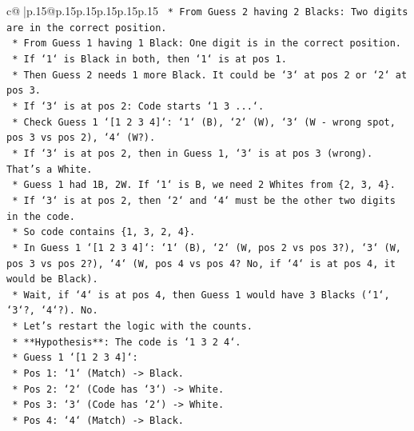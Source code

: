 \documentclass{article}
\begin{document}
{\begin{supertabular}{c@{$\;$}|p{.15\linewidth}@{}p{.15\linewidth}p{.15\linewidth}p{.15\linewidth}p{.15\linewidth}p{.15\linewidth}}
{{{\texttt{                *   From Guess 2 having 2 Blacks: Two digits are in the correct position.} \\
\texttt{                *   From Guess 1 having 1 Black: One digit is in the correct position.} \\
\texttt{                *   If `1` is Black in both, then `1` is at pos 1.} \\
\texttt{                *   Then Guess 2 needs 1 more Black. It could be `3` at pos 2 or `2` at pos 3.} \\
\texttt{                *   If `3` is at pos 2: Code starts `1 3 ...`.} \\
\texttt{                    *   Check Guess 1 `{[}1 2 3 4{]}`: `1` (B), `2` (W), `3` (W {-} wrong spot, pos 3 vs pos 2), `4` (W?).} \\
\texttt{                    *   If `3` is at pos 2, then in Guess 1, `3` is at pos 3 (wrong). That's a White.} \\
\texttt{                    *   Guess 1 had 1B, 2W. If `1` is B, we need 2 Whites from \{2, 3, 4\}.} \\
\texttt{                    *   If `3` is at pos 2, then `2` and `4` must be the other two digits in the code.} \\
\texttt{                    *   So code contains \{1, 3, 2, 4\}.} \\
\texttt{                    *   In Guess 1 `{[}1 2 3 4{]}`: `1` (B), `2` (W, pos 2 vs pos 3?), `3` (W, pos 3 vs pos 2?), `4` (W, pos 4 vs pos 4? No, if `4` is at pos 4, it would be Black).} \\
\texttt{                    *   Wait, if `4` is at pos 4, then Guess 1 would have 3 Blacks (`1`, `3`?, `4`?). No.} \\
\texttt{                    *   Let's restart the logic with the counts.} \\
\texttt{                    *   **Hypothesis**: The code is `1 3 2 4`.} \\
\texttt{                        *   Guess 1 `{[}1 2 3 4{]}`:} \\
\texttt{                            *   Pos 1: `1` (Match) {-}> Black.} \\
\texttt{                            *   Pos 2: `2` (Code has `3`) {-}> White.} \\
\texttt{                            *   Pos 3: `3` (Code has `2`) {-}> White.} \\
\texttt{                            *   Pos 4: `4` (Match) {-}> Black.} \\
}}}
\end{supertabular}}
\end{document}
